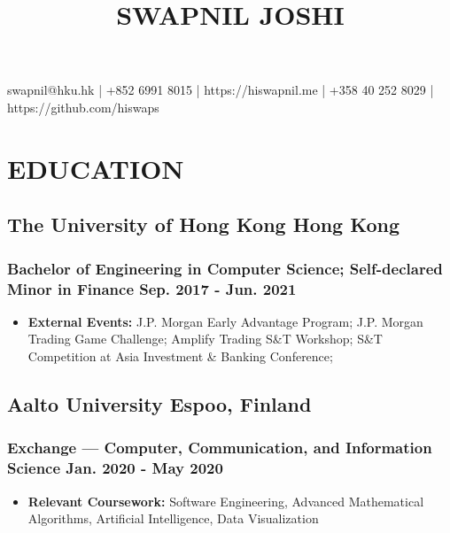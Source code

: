 \documentclass{article}
\makeatletter
\renewcommand{\maketitle}{

\begin{center}
{\huge\bfseries
\thetitle}

\vspace*{0.5cm}

swapnil@hku.hk | +852 6991 8015 | https://hiswapnil.me | +358 40 252 8029 | https://github.com/hiswaps

\end{center}
}
\makeatother
\begin{document}
\title{SWAPNIL JOSHI}
\maketitle
\thispagestyle{empty} 





\section{EDUCATION}
\vspace{-1.5mm}
\subsection{The University of Hong Kong \hspace{4.12in} Hong Kong}
\subsubsection{Bachelor of Engineering in Computer Science; Self-declared Minor in Finance \hspace{1.29in} Sep. 2017 - Jun. 2021}
\vspace{-2.9mm}
\begin{itemize}[noitemsep]
\item  \textbf{External Events:} J.P. Morgan Early Advantage Program; J.P. Morgan Trading Game Challenge; Amplify Trading S\&T Workshop; S\&T Competition at Asia Investment \& Banking Conference; 

\end{itemize}

\vspace{-1.6mm}

\subsection{Aalto University \hspace{4.8in} Espoo, Finland}
\subsubsection{Exchange —  Computer, Communication, and Information Science \hspace{2.1in} Jan. 2020 - May 2020}
\vspace{-2.9mm}
\begin{itemize}[noitemsep]
\item \textbf{Relevant Coursework:} Software Engineering, Advanced Mathematical Algorithms, Artificial Intelligence, Data Visualization
\end{itemize}
\end{document}
